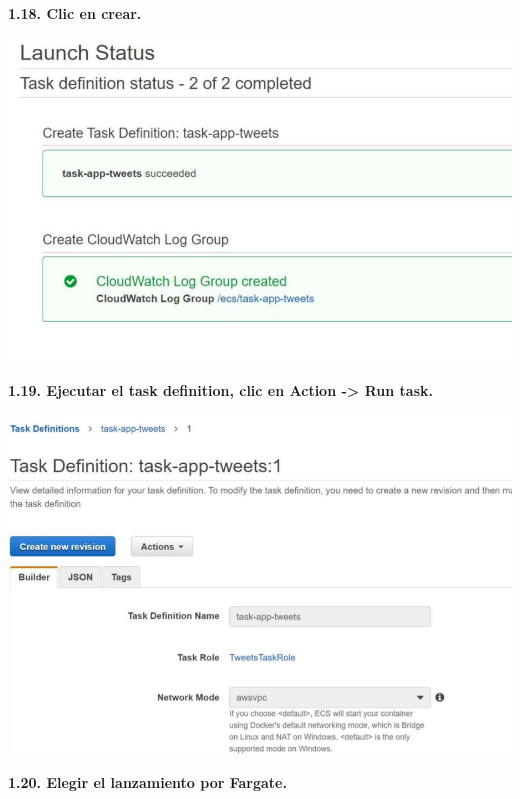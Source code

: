 \documentclass{article}
\begin{document}
	
	
		\textbf{1.18. Clic en crear.
}

    \begin{center}
		\includegraphics[width=15cm]{./images/20} 
	\end{center}
	
	
		\textbf{1.19.  Ejecutar el task definition, clic en Action -> Run task.
}

    \begin{center}
		\includegraphics[width=15cm]{./images/21} 
	\end{center}
	
	
		\textbf{1.20.  Elegir el lanzamiento por Fargate.
}
\end{document}
